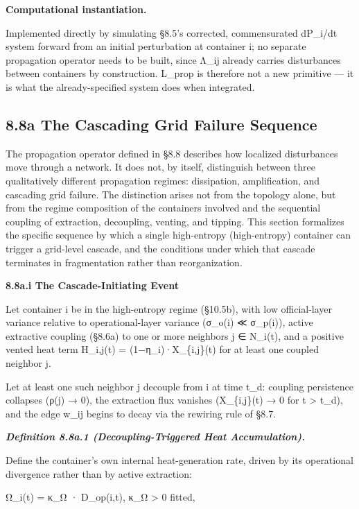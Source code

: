 \documentclass[
]{article}
\begin{document}
\textbf{Computational instantiation.}

Implemented directly by simulating §8.5's corrected, commensurated
dP\_i/dt system forward from an initial perturbation at container i; no
separate propagation operator needs to be built, since Λ\_ij already
carries disturbances between containers by construction. L\_prop is
therefore not a new primitive --- it is what the already-specified
system does when integrated.

\hypertarget{a-the-cascading-grid-failure-sequence}{%
\subsection{8.8a The Cascading Grid Failure
Sequence}\label{a-the-cascading-grid-failure-sequence}}

The propagation operator defined in §8.8 describes how localized
disturbances move through a network. It does not, by itself, distinguish
between three qualitatively different propagation regimes: dissipation,
amplification, and cascading grid failure. The distinction arises not
from the topology alone, but from the regime composition of the
containers involved and the sequential coupling of extraction,
decoupling, venting, and tipping. This section formalizes the specific
sequence by which a single high-entropy (high-entropy) container can
trigger a grid-level cascade, and the conditions under which that
cascade terminates in fragmentation rather than reorganization.

\textbf{8.8a.i The Cascade-Initiating Event}

Let container i be in the high-entropy regime (§10.5b), with low
official-layer variance relative to operational-layer variance (σ\_o(i)
≪ σ\_p(i)), active extractive coupling (§8.6a) to one or more neighbors
j ∈ N\_i(t), and a positive vented heat term H\_i,j(t) =
(1−η\_i)·X\_\{i,j\}(t) for at least one coupled neighbor j.

Let at least one such neighbor j decouple from i at time t\_d: coupling
persistence collapses (ρ(j) → 0), the extraction flux vanishes
(X\_\{i,j\}(t) → 0 for t \textgreater{} t\_d), and the edge w\_ij begins
to decay via the rewiring rule of §8.7.

\emph{\textbf{Definition 8.8a.1 (Decoupling-Triggered Heat
Accumulation).}}

Define the container's own internal heat-generation rate, driven by its
operational divergence rather than by active extraction:

Ω\_i(t) = κ\_Ω · D\_op(i,t), κ\_Ω \textgreater{} 0 fitted,
\end{document}
